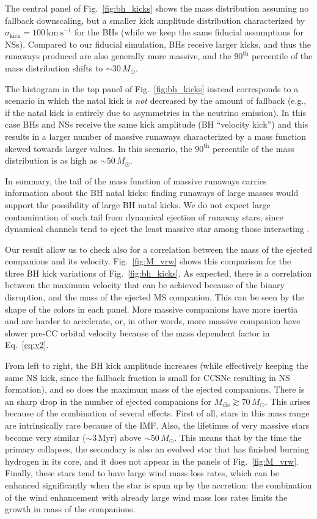 \documentclass{aa}
\DeclareRobustCommand{\Eqref}[1]{Eq.~\ref{#1}}
\DeclareRobustCommand{\Figref}[1]{Fig.~\ref{#1}}
\begin{document}
The central panel of \Figref{fig:bh_kicks} shows the mass distribution
assuming no fallback downscaling, but a smaller kick amplitude
distribution characterized by $\sigma_\mathrm{kick}=100\,\mathrm{km \
  s^{-1}}$ for the BHs (while we keep the same fiducial assumptions
for NSs). Compared to our fiducial
simulation, BHs receive larger kicks, and thus the runaways produced
are also generally more massive, and the $90^\mathrm{th}$ percentile
of the mass distribution shifts to $\sim$$30\,M_\odot$. 

The histogram in the top panel of \Figref{fig:bh_kicks} instead corresponds
to a scenario in which the natal kick is \emph{not} decreased by the amount of
fallback (e.g., if the natal kick is entirely due to asymmetries in the neutrino
emission). In this case BHs and NSs receive the same kick amplitude
(BH ``velocity kick'') and this results in a larger number of massive
runaways characterized by a mass function skewed towards larger
values. In this scenario, the $90^\mathrm{th}$ percentile of the mass
distribution is as high as $\sim$$50\,M_\odot$.

In summary, the tail of the mass function of massive runaways carries
information about the BH natal kicks: finding runaways of large masses
would support the possibility of large BH natal kicks. We do not
expect large contamination of such tail from dynamical ejection
of runaway stars, since dynamical channels tend to eject the least
massive star among those interacting \citep[although see
also][]{fujii:11, oh:16}.


Our result allow us to check also for a correlation between the mass
of the ejected companions and its velocity. \Figref{fig:M_vrw} shows
this comparison for the three BH kick variations of
\Figref{fig:bh_kicks}. As expected, there is a correlation between the
maximum velocity that can be achieved because of
the binary disruption, and the mass of the ejected MS companion. This
can be seen by the shape of the colors in each panel. More massive companions have more
inertia and are harder to accelerate, or, in other words, more massive
companion have slower pre-CC orbital velocity because of the mass
dependent factor in \Eqref{eq:v2}.

From left to right, the BH kick amplitude increases (while effectively
keeping the same NS kick, since the fallback fraction is small for
CCSNe resulting in NS formation), and so does the maximum mass of the
ejected companions. There is an sharp drop in the number of ejected
companions for $M_\mathrm{dis}\gtrsim70\,M_\odot$. This
arises because of the combination of several effects. First of all,
stars in this mass range are intrinsically rare because of the
IMF. Also, the lifetimes of very
massive stars become very similar ($\sim3\,\mathrm{Myr}$) above $\sim$$50\,M_\odot$. This
means that by the time the primary collapses, the secondary is also an
evolved star that has finished burning hydrogen in its core, and it
does not appear in the panels of \Figref{fig:M_vrw}. Finally,
these stars tend to have large wind mass loss rates, which can be
enhanced significantly when the star is spun up by the accretion: the
combination of the wind enhancement with already large wind mass loss
rates limits the growth in mass of the companions.
\end{document}
